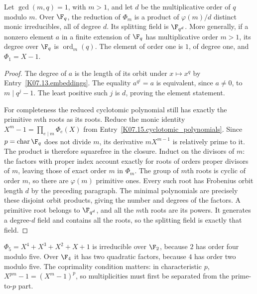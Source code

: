 \begin{theorem}
Let $\gcd(m,q)=1$, with $m>1$, and let $d$ be the multiplicative order of $q$ modulo $m$. Over $\F_q$, the reduction of $\Phi_m$ is a product of $\varphi(m)/d$ distinct monic irreducibles, all of degree $d$. Its splitting field is $\F_{q^d}$. More generally, if a nonzero element $a$ in a finite extension of $\F_q$ has multiplicative order $m>1$, its degree over $\F_q$ is $\operatorname{ord}_m(q)$. The element of order one is $1$, of degree one, and $\Phi_1=X-1$.
\end{theorem}
\begin{proof}
The degree of $a$ is the length of its orbit under $x\mapsto x^q$ by Entry~\ref{K07.13.embeddings}. The equality $a^{q^j}=a$ is equivalent, since $a\ne0$, to $m\mid q^j-1$. The least positive such $j$ is $d$, proving the element statement.

For completeness the reduced cyclotomic polynomial still has exactly the primitive $m$th roots as its roots. Reduce the monic identity $X^m-1=\prod_{e\mid m}\Phi_e(X)$ from Entry~\ref{K07.15.cyclotomic_polynomials}. Since $p=\operatorname{char}\F_q$ does not divide $m$, its derivative $mX^{m-1}$ is relatively prime to it. The product is therefore squarefree in the closure. Induct on the divisors of $m$: the factors with proper index account exactly for roots of orders proper divisors of $m$, leaving those of exact order $m$ in $\Phi_m$. The group of $m$th roots is cyclic of order $m$, so there are $\varphi(m)$ primitive ones. Every such root has Frobenius orbit length $d$ by the preceding paragraph. The minimal polynomials are precisely these disjoint orbit products, giving the number and degrees of the factors. A primitive root belongs to $\F_{q^d}$, and all the $m$th roots are its powers. It generates a degree-$d$ field and contains all the roots, so the splitting field is exactly that field.
\end{proof}
\begin{example}
$\Phi_5=X^4+X^3+X^2+X+1$ is irreducible over $\F_2$, because $2$ has order four modulo five. Over $\F_4$ it has two quadratic factors, because $4$ has order two modulo five. The coprimality condition matters: in characteristic $p$, $X^{pm}-1=(X^m-1)^p$, so multiplicities must first be separated from the prime-to-$p$ part.
\end{example}

